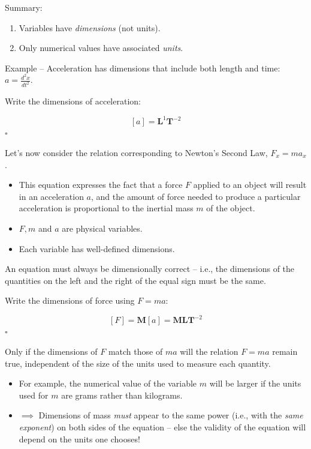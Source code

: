 \documentclass[11pt, letterpaper, openany]{book}
\newenvironment{exercise}[1][Exercise]{%
  \tcolorbox[blanker, breakable, left=1em,
    before skip=1em, after skip=1em,
    borderline west={3pt}{0pt}{PhysNavy},
    colback=PhysCream,
    before upper={\textcolor{PhysNavy}{\sffamily\bfseries #1:}\space}
  ]%
}{%
  \endtcolorbox%
}
\newenvironment{solution}[1][Solution]{%
  \tcolorbox[blanker, breakable, left=1em,
    before skip=1em, after skip=1em,
    borderline west={2pt}{0pt}{PhysTeal},
    colback=PhysCream,
    before upper={\textcolor{PhysTeal}{\sffamily\bfseries #1.}\space}
  ]%
}{%
  \hfill\textcolor{PhysTeal}{\ensuremath{\square}}\endtcolorbox%
}
\begin{document}
\begin{tcolorbox}[colback=white, colframe=black, boxrule=0.5pt, arc=0pt]
Summary:
\begin{enumerate}
    \item Variables have \textit{dimensions} (not units).
    \item Only numerical values have associated \textit{units}.
\end{enumerate}
\end{tcolorbox}

Example -- Acceleration has dimensions that include both length and time: $a = \frac{d^2x}{dt^2}$.

\begin{exercise}[Quick Exercise 2]
Write the dimensions of acceleration:
\end{exercise}
\begin{solution}
\[ [a] = \textbf{L}^1\textbf{T}^{-2} \]
\end{solution}

Let's now consider the relation corresponding to Newton's Second Law, $F_x = ma_x$.
\begin{itemize}
    \item This equation expresses the fact that a force $F$ applied to an object will result in an acceleration $a$, and the amount of force needed to produce a particular acceleration is proportional to the inertial mass $m$ of the object.
    \item $F, m$ and $a$ are physical variables.
    \item Each variable has well-defined dimensions.
\end{itemize}

An equation must always be dimensionally correct -- i.e., the dimensions of the quantities on the left and the right of the equal sign must be the same.

\begin{exercise}[Quick Exercise 3]
Write the dimensions of force using $F = ma$:
\end{exercise}
\begin{solution}
\[ [F] = \textbf{M}[a] = \textbf{M}\textbf{L}\textbf{T}^{-2} \]
\end{solution}

Only if the dimensions of $F$ match those of $ma$ will the relation $F = ma$ remain true, independent of the size of the units used to measure each quantity.
\begin{itemize}
    \item For example, the numerical value of the variable $m$ will be larger if the units used for $m$ are grams rather than kilograms.
    \item $\implies$ Dimensions of mass \textit{must} appear to the same power (i.e., with the \textit{same exponent}) on both sides of the equation -- else the validity of the equation will depend on the units one chooses!
\end{itemize}
\end{document}
